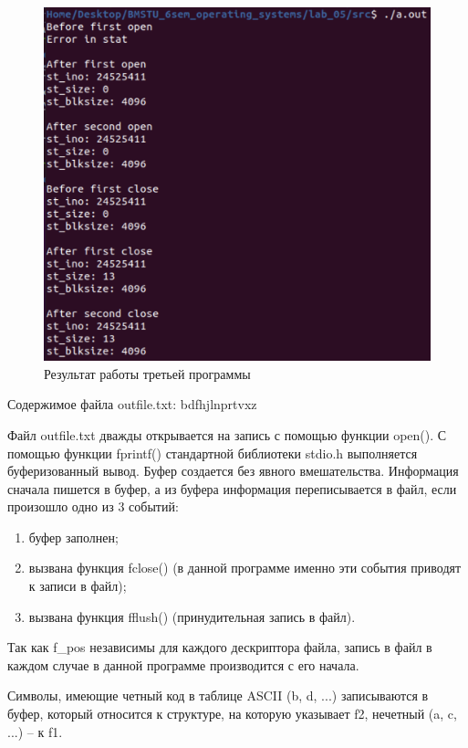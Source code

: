 \documentclass[12pt]{report}
\begin{document}
\begin{figure}[H]
	\centering
	\includegraphics[scale=0.6]{img/prog_03.png}
	\caption{Результат работы третьей программы}
	\label{fig:prog_03}
\end{figure}

Содержимое файла outfile.txt: bdfhjlnprtvxz

Файл outfile.txt дважды открывается на запись с помощью функции open(). 
С помощью функции fprintf() стандартной библиотеки stdio.h выполняется буферизованный вывод. Буфер создается без явного вмешательства. Информация сначала пишется в буфер, а из буфера информация переписывается в файл, если произошло одно из 3 событий:

\begin{enumerate}
	\item буфер заполнен;
	\item вызвана функция fclose() (в данной программе именно эти события приводят к записи в файл);
	\item вызвана функция fflush() (принудительная запись в файл).
\end{enumerate}

Так как f\_pos независимы для каждого дескриптора файла, запись в файл в каждом случае  в данной программе производится с его начала.

Символы, имеющие четный код в таблице ASCII  (b, d, ...) записываются в буфер, который относится к структуре, на которую указывает f2, нечетный (a, c, ...) -- к f1. 
\end{document}
